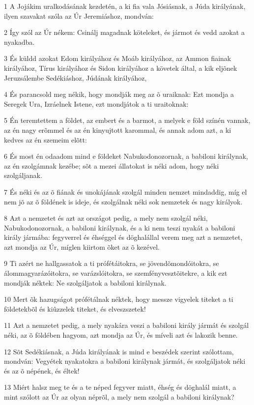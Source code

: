 \par 1 A Jojákim uralkodásának kezdetén, a ki fia vala Jósiásnak, a Júda királyának, ilyen szavakat szóla az Úr Jeremiáshoz, mondván:
\par 2 Így szól az Úr nékem: Csinálj magadnak köteleket, és jármot és vedd azokat a nyakadba.
\par 3 És küldd azokat Edom királyához és Moáb királyához, az Ammon fiainak királyához, Tírus királyához és Sidon királyához a követek által, a kik eljõnek Jeruzsálembe Sedékiáshoz, Júdának királyához,
\par 4 És parancsold meg nékik, hogy mondják meg az õ uraiknak: Ezt mondja a Seregek Ura, Izráelnek Istene, ezt mondjátok a ti uraitoknak:
\par 5 Én teremtettem a földet, az embert és a barmot, a melyek e föld színén vannak, az én nagy erõmmel és az én kinyujtott karommal, és annak adom azt, a ki kedves az én szemeim elõtt:
\par 6 És most én odaadom mind e földeket Nabukodonozornak, a babiloni királynak, az én szolgámnak kezébe; sõt a mezei állatokat is néki adom, hogy néki szolgáljanak.
\par 7 És néki és az õ fiának és unokájának szolgál minden nemzet mindaddig, míg el nem jõ az õ földének is ideje, és szolgálnak néki sok nemzetek és nagy királyok.
\par 8 Azt a nemzetet és azt az országot pedig, a mely nem szolgál néki, Nabukodonozornak, a babiloni királynak, és a ki nem teszi nyakát a babiloni király jármába: fegyverrel és éhséggel és döghalállal verem meg azt a nemzetet, azt mondja az Úr, míglen kiirtom õket az õ kezével.
\par 9 Ti azért ne hallgassatok a ti prófétáitokra, se jövendõmondóitokra, se álommagyarázóitokra, se varázslóitokra, se szemfényvesztõitekre, a kik ezt mondják néktek: Ne szolgáljatok a babiloni királynak.
\par 10 Mert õk hazugságot prófétálnak néktek, hogy messze vigyelek titeket a ti földetekbõl és kiûzzelek titeket, és elveszszetek!
\par 11 Azt a nemzetet pedig, a mely nyakára veszi a babiloni király jármát és szolgál néki, az õ földében hagyom, azt mondja az Úr, és míveli azt és lakozik benne.
\par 12 Sõt Sedékiásnak, a Júda királyának is mind e beszédek szerint szólottam, mondván: Vegyétek nyakatokra a babiloni királynak jármát, és szolgáljatok néki és az õ népének, és éltek!
\par 13 Miért halsz meg te és a te néped fegyver miatt, éhség és döghalál miatt, a mint szólott az Úr az olyan néprõl, a mely nem szolgál a babiloni királynak?
